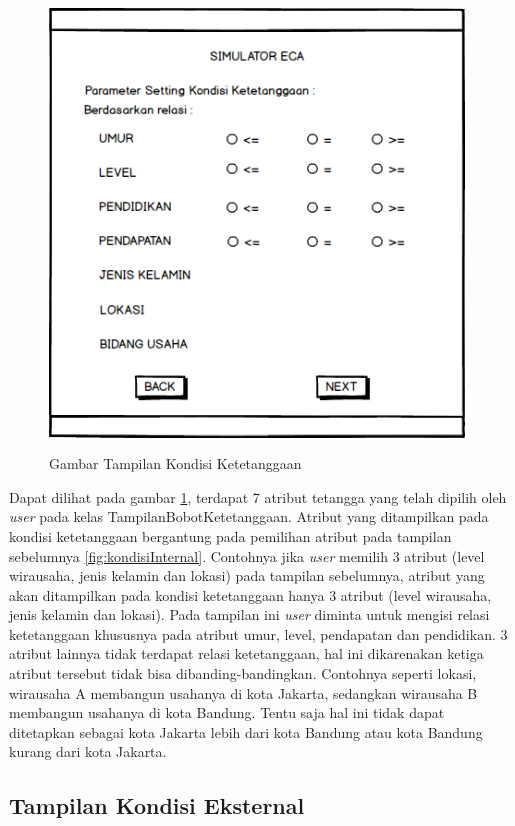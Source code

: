 \begin{figure} [H]
	\centering  
	\includegraphics[width=11cm, height=12cm]{mockup2} 
	\caption[Gambar Tampilan Kondisi Ketetanggaan]{Gambar Tampilan Kondisi Ketetanggaan}
	\label{fig:kondisiTetangga} 
\end{figure}

Dapat dilihat pada gambar \ref{fig:kondisiTetangga}, terdapat 7 atribut tetangga yang telah dipilih oleh \textit{user} pada kelas TampilanBobotKetetanggaan. Atribut yang ditampilkan pada kondisi ketetanggaan bergantung pada pemilihan atribut pada tampilan sebelumnya \ref{fig:kondisiInternal}. Contohnya jika \textit{user} memilih 3 atribut (level wirausaha, jenis kelamin dan lokasi) pada tampilan sebelumnya, atribut yang akan ditampilkan pada kondisi ketetanggaan hanya 3 atribut (level wirausaha, jenis kelamin dan lokasi). Pada tampilan ini \textit{user} diminta untuk mengisi relasi ketetanggaan khususnya pada atribut umur, level, pendapatan dan pendidikan. 3 atribut lainnya tidak terdapat relasi ketetanggaan, hal ini dikarenakan ketiga atribut tersebut tidak bisa dibanding-bandingkan. Contohnya seperti lokasi, wirausaha A membangun usahanya di kota Jakarta, sedangkan wirausaha B membangun usahanya di kota Bandung. Tentu saja hal ini tidak dapat ditetapkan sebagai kota Jakarta lebih dari kota Bandung atau kota Bandung kurang dari kota Jakarta.

\subsection{Tampilan Kondisi Eksternal}

